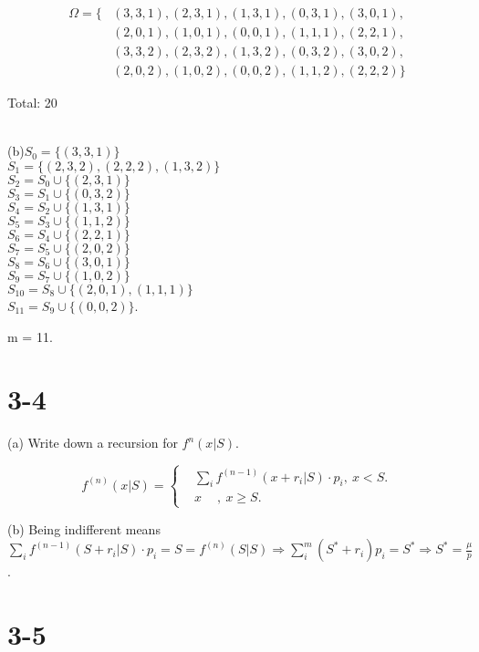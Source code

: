 \documentclass[UTF8]{article}
\begin{document}
\begin{align*}
  \Omega =\{&(3,3,1),(2,3,1),(1,3,1),(0,3,1),(3,0,1),\\
            &(2,0,1),(1,0,1),(0,0,1),(1,1,1),(2,2,1),\\
              &(3,3,2),(2,3,2),(1,3,2),(0,3,2),(3,0,2),\\
              &(2,0,2),(1,0,2),(0,0,2),(1,1,2),(2,2,2)\}
\end{align*}

Total: 20

~\\

(b)$S_0 = \{(3,3,1)\}$\\
$S_1 = \{(2,3,2),(2,2,2),(1,3,2)\}$\\
$S_2 = S_0 \cup \{(2,3,1)\}$\\
$S_3 = S_1 \cup \{(0,3,2)\}$\\
$S_4 = S_2 \cup \{(1,3,1)\}$\\
$S_5 = S_3 \cup \{(1,1,2)\}$\\
$S_6 = S_4 \cup \{(2,2,1)\}$\\
$S_7 = S_5 \cup \{(2,0,2)\}$\\
$S_8 = S_6 \cup \{(3,0,1)\}$\\
$S_9 = S_7 \cup \{(1,0,2)\}$\\
$S_{10} = S_8 \cup \{(2,0,1),(1,1,1)\}$\\
$S_{11} = S_9 \cup \{(0,0,2)\}$.

m = 11.

\section*{3-4}
(a) Write down a recursion for $f^n(x|S)$.


 $$ f^{(n)}(x|S)=\left\{
 \begin{aligned}
 & \sum_{i} f^{(n-1)}(x+r_i|S)\cdot p_i,~ x<S.  \\
 & x ~\quad, ~ x\geq S.
 \end{aligned}
 \right.
 $$

 (b) Being indifferent means $\sum_{i} f^{(n-1)}(S+r_i|S)\cdot p_i = S = f^{(n)}(S|S) \Rightarrow \sum_i^m(S^*+r_i)p_i = S^* \Rightarrow S^* = \frac{\mu}{p}$.

\section*{3-5}
\end{document}
